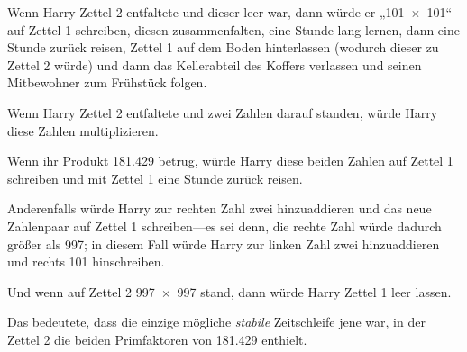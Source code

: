 Wenn Harry Zettel 2 entfaltete und dieser leer war, dann würde er „101~$\times$~101“ auf Zettel 1 schreiben, diesen zusammenfalten, eine Stunde lang lernen, dann eine Stunde zurück reisen, Zettel 1 auf dem Boden hinterlassen (wodurch dieser zu Zettel 2 würde) und dann das Kellerabteil des Koffers verlassen und seinen Mitbewohner zum Frühstück folgen.

Wenn Harry Zettel 2 entfaltete und zwei Zahlen darauf standen, würde Harry diese Zahlen multiplizieren.

Wenn ihr Produkt 181.429 betrug, würde Harry diese beiden Zahlen auf Zettel 1 schreiben und mit Zettel 1 eine Stunde zurück reisen.

Anderenfalls würde Harry zur rechten Zahl zwei hinzuaddieren und das neue Zahlenpaar auf Zettel 1 schreiben—es sei denn, die rechte Zahl würde dadurch größer als 997; in diesem Fall würde Harry zur linken Zahl zwei hinzuaddieren und rechts 101 hinschreiben.

Und wenn auf Zettel 2 997~$\times$~997 stand, dann würde Harry Zettel 1 leer lassen.

Das bedeutete, dass die einzige mögliche \emph{stabile} Zeitschleife jene war, in der Zettel 2 die beiden Primfaktoren von 181.429 enthielt.

